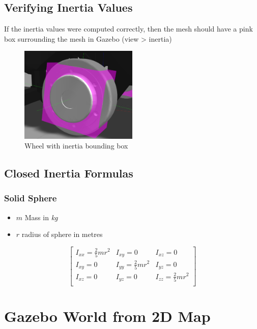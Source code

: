 \documentclass[11pt]{article}
\begin{document}
\subsection{Verifying Inertia Values}
If the inertia values were computed correctly, then the mesh should have a pink box surrounding the mesh in Gazebo (view > inertia)
\begin{figure}[H]
 \centering
 \includegraphics[width=0.5\textwidth]{images/inertiawheel}
 \caption{Wheel with inertia bounding box}
\end{figure}

\subsection{Closed Inertia Formulas}
\subsubsection{Solid Sphere}
\begin{itemize}
 \item {
       $m$ Mass in \emph{kg}
       }
       
 \item {
       $r$ radius of sphere in metres
       }
\end{itemize}

$$
 \begin{bmatrix}
  I_{xx}=\frac{2}{5}mr^2 & I_{xy}=0               & I_{xz}=0               \\
  I_{xy}=0               & I_{yy}=\frac{2}{5}mr^2 & I_{yz}=0               \\
  I_{xz}=0               & I_{yz}=0               & I_{zz}=\frac{2}{5}mr^2 \\
 \end{bmatrix}
$$


\section{Gazebo World from 2D Map}
\end{document}
